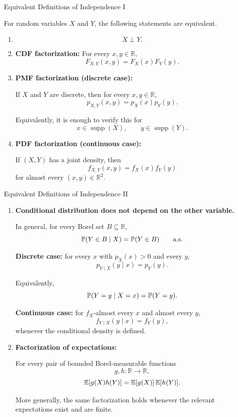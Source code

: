 \begin{frame}{Equivalent Definitions of Independence I}

For random variables $X$ and $Y$, the following statements are equivalent.

\begin{enumerate}

\item[\textbf{1.}] 
$$
X\perp Y.
$$

\item[\textbf{2.}] \textbf{CDF factorization:} For every $x,y\in\mathbb R$,
$$
F_{X,Y}(x,y)
=
F_X(x)F_Y(y).
$$

\item[\textbf{3a.}] \textbf{PMF factorization (discrete case):}

If $X$ and $Y$ are discrete, then for every $x,y\in\mathbb R$,
$$
p_{X,Y}(x,y)
=
p_X(x)p_Y(y).
$$

Equivalently, it is enough to verify this for
$$
x\in\operatorname{supp}(X),
\qquad
y\in\operatorname{supp}(Y).
$$

\item[\textbf{3b.}] \textbf{PDF factorization (continuous case):}

If $(X,Y)$ has a joint density, then
$$
f_{X,Y}(x,y)
=
f_X(x)f_Y(y)
$$
for almost every $(x,y)\in\mathbb R^2$.

\end{enumerate}

\end{frame}


\begin{frame}{Equivalent Definitions of Independence II}

\begin{enumerate}

\item[\textbf{4.}] \textbf{Conditional distribution does not depend on the other variable.}

In general, for every Borel set $B\subseteq\mathbb R$,
$$
\mathbb{P}(Y\in B\mid X)
=
\mathbb{P}(Y\in B)
\qquad\text{a.s.}
$$

\textbf{Discrete case:} for every $x$ with $p_X(x)>0$ and every $y$,
$$
p_{Y\mid X}(y\mid x)
=
p_Y(y).
$$

Equivalently,
$$
\mathbb{P}(Y=y\mid X=x)
=
\mathbb{P}(Y=y).
$$

\textbf{Continuous case:} for $f_X$-almost every $x$ and almost every $y$,
$$
f_{Y\mid X}(y\mid x)
=
f_Y(y),
$$
whenever the conditional density is defined.

\item[\textbf{5.}] \textbf{Factorization of expectations:}

For every pair of bounded Borel-measurable functions
$$
g,h:\mathbb R\to\mathbb R,
$$
$$
\mathbb{E}[g(X)h(Y)]
=
\mathbb{E}[g(X)]\,\mathbb{E}[h(Y)].
$$

More generally, the same factorization holds whenever the relevant
expectations exist and are finite.

\end{enumerate}

\end{frame}


